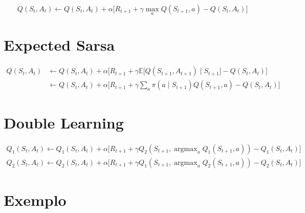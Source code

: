 \documentclass{article}
\DeclareMathOperator*{\argmax}{argmax}
\begin{document}
        \begin{equation}
            Q(S_t, A_t) \leftarrow Q(S_t, A_t) + \alpha \Big[ R_{t+1} + \gamma \max_{a} Q(S_{t+1}, a) - Q(S_t, A_t) \Big]
        \end{equation}
    
    \section{Expected Sarsa}
    
        \begin{equation}
        \begin{split}
            Q(S_t, A_t) & \leftarrow Q(S_t, A_t) + \alpha \Big[ R_{t+1} + \gamma \mathbb{E} \big[ Q(S_{t+1}, A_{t+1}) \mid S_{t+1} \big] - Q(S_t, A_t) \Big] \\
            & \leftarrow Q(S_t, A_t) + \alpha \Big[ R_{t+1} + \gamma \sum_a \pi(a \mid S_{t+1}) Q(S_{t+1},a) - Q(S_t, A_t) \Big]
        \end{split}
        \end{equation}
        
    \section{Double Learning}
    
        \begin{equation}
        \begin{split}
            Q_{1}(S_t, A_t) \leftarrow Q_{1}(S_t, A_t) + \alpha \Big[ R_{t+1} + \gamma Q_{2}(S_{t+1}, \argmax_a Q_{1}(S_{t+1}, a)) - Q_{1}(S_t, A_t) \Big] \\
            Q_{2}(S_t, A_t) \leftarrow Q_{2}(S_t, A_t) + \alpha \Big[ R_{t+1} + \gamma Q_{1}(S_{t+1}, \argmax_a Q_{2}(S_{t+1}, a)) - Q_{2}(S_t, A_t) \Big]
        \end{split}
        \end{equation}
    
    \section{Exemplo}
    
\end{document}
